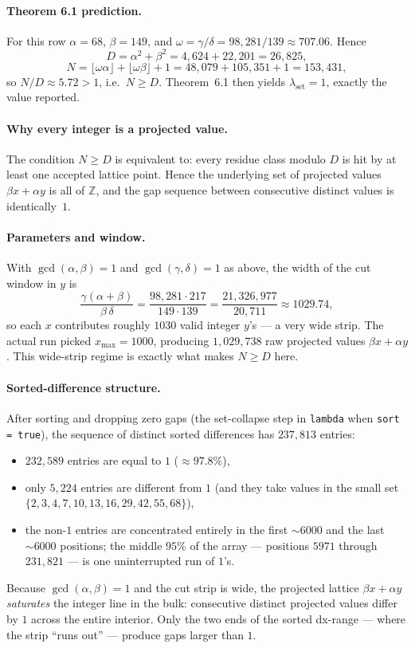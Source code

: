 \documentclass[11pt]{article}
\begin{document}
\paragraph{Theorem 6.1 prediction.}
For this row $\alpha = 68$, $\beta = 149$, and $\omega = \gamma/\delta
= 98{,}281/139 \approx 707.06$. Hence
\[
D = \alpha^2 + \beta^2 = 4{,}624 + 22{,}201 = 26{,}825,
\]
\[
N = \lfloor\omega\alpha\rfloor + \lfloor\omega\beta\rfloor + 1
  = 48{,}079 + 105{,}351 + 1 = 153{,}431,
\]
so $N/D \approx 5.72 > 1$, i.e.\ $N \ge D$. Theorem~6.1 then yields
$\lambda_{\text{set}} = 1$, exactly the value reported.

\paragraph{Why every integer is a projected value.}
The condition $N \ge D$ is equivalent to: every residue class modulo
$D$ is hit by at least one accepted lattice point. Hence the
underlying set of projected values $\beta x + \alpha y$ is all of
$\mathbb{Z}$, and the gap sequence between consecutive distinct values
is identically~$1$.

\paragraph{Parameters and window.}
With $\gcd(\alpha,\beta)=1$ and $\gcd(\gamma,\delta)=1$ as above, the
width of the cut window in $y$ is
\[
\frac{\gamma(\alpha+\beta)}{\beta\,\delta}
= \frac{98{,}281 \cdot 217}{149 \cdot 139}
= \frac{21{,}326{,}977}{20{,}711} \approx 1029.74,
\]
so each $x$ contributes roughly $1030$ valid integer $y$'s — a very wide
strip. The actual run picked $x_{\max} = 1000$, producing $1{,}029{,}738$
raw projected values $\beta x + \alpha y$. This wide-strip regime is
exactly what makes $N \ge D$ here.

\paragraph{Sorted-difference structure.}
After sorting and dropping zero gaps (the set-collapse step in
\texttt{lambda} when \texttt{sort = true}), the sequence of distinct
sorted differences has $237{,}813$ entries:
\begin{itemize}
\item $232{,}589$ entries are equal to $1$ ($\approx 97.8\%$),
\item only $5{,}224$ entries are different from $1$ (and they take values
      in the small set \\ $\{2,3,4,7,10,13,16,29,42,55,68\}$),
\item the non-$1$ entries are concentrated entirely in the first
      $\sim\!6000$ and the last $\sim\!6000$ positions; the middle
      $95\%$ of the array — positions $5971$ through $231{,}821$ — is
      one uninterrupted run of $1$'s.
\end{itemize}
Because $\gcd(\alpha,\beta) = 1$ and the cut strip is wide, the
projected lattice $\beta x + \alpha y$ \emph{saturates} the integer line
in the bulk: consecutive distinct projected values differ by $1$ across
the entire interior. Only the two ends of the sorted dx-range — where
the strip ``runs out'' — produce gaps larger than $1$.
\end{document}
